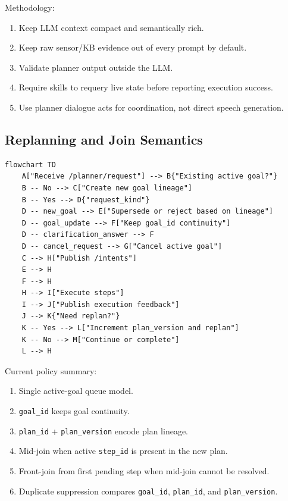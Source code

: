 \documentclass[12pt,a4paper]{article}
\newcommand{\code}[1]{\texttt{#1}}
\begin{document}
Methodology:

\begin{enumerate}
\item Keep LLM context compact and semantically rich.
\item Keep raw sensor/KB evidence out of every prompt by default.
\item Validate planner output outside the LLM.
\item Require skills to requery live state before reporting execution success.
\item Use planner dialogue acts for coordination, not direct speech generation.
\end{enumerate}



\subsection{Replanning and Join Semantics}

\begin{lstlisting}[caption={Diagram source from canonical Markdown}]
flowchart TD
    A["Receive /planner/request"] --> B{"Existing active goal?"}
    B -- No --> C["Create new goal lineage"]
    B -- Yes --> D{"request_kind"}
    D -- new_goal --> E["Supersede or reject based on lineage"]
    D -- goal_update --> F["Keep goal_id continuity"]
    D -- clarification_answer --> F
    D -- cancel_request --> G["Cancel active goal"]
    C --> H["Publish /intents"]
    E --> H
    F --> H
    H --> I["Execute steps"]
    I --> J["Publish execution feedback"]
    J --> K{"Need replan?"}
    K -- Yes --> L["Increment plan_version and replan"]
    K -- No --> M["Continue or complete"]
    L --> H
\end{lstlisting}

Current policy summary:

\begin{enumerate}
\item Single active-goal queue model.
\item \code{goal\_id} keeps goal continuity.
\item \code{plan\_id} + \code{plan\_version} encode plan lineage.
\item Mid-join when active \code{step\_id} is present in the new plan.
\item Front-join from first pending step when mid-join cannot be resolved.
\item Duplicate suppression compares \code{goal\_id}, \code{plan\_id}, and \code{plan\_version}.
\end{enumerate}
\end{document}
